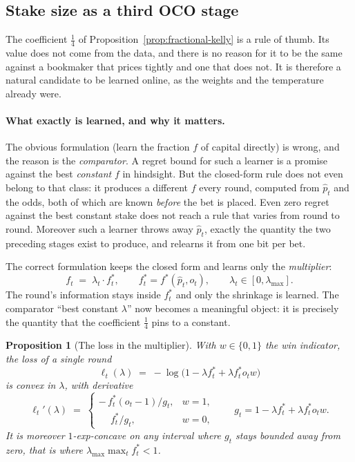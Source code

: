 \documentclass[12pt,a4paper,oneside]{report}
\renewcommand{\_}{\oldunderscore\allowbreak}
\theoremstyle{definition}
\theoremstyle{plain}
\newtheorem{proposition}[theorem]{Proposition}
\theoremstyle{definition}   %
\begin{document}
\subsection{Stake size as a third OCO stage}
\label{sec:oco-kelly-theory}

The coefficient $\tfrac14$ of Proposition~\ref{prop:fractional-kelly} is a rule of thumb. Its
value does not come from the data, and there is no reason for it to be the same against a
bookmaker that prices tightly and one that does not. It is therefore a natural candidate to be
learned online, as the weights and the temperature already were.

\paragraph{What exactly is learned, and why it matters.} The obvious formulation (learn the
fraction $f$ of capital directly) is wrong, and the reason is the \emph{comparator}. A regret
bound for such a learner is a promise against the best \emph{constant} $f$ in hindsight. But
the closed-form rule does not even belong to that class: it produces a different $f$ every
round, computed from $\hat{p}_t$ and the odds, both of which are known \emph{before} the bet is
placed. Even zero regret against the best constant stake does not reach a rule that varies from
round to round. Moreover such a learner throws away $\hat{p}_t$, exactly the quantity the two
preceding stages exist to produce, and relearns it from one bit per bet.

The correct formulation keeps the closed form and learns only the \emph{multiplier}:
\[
f_t \;=\; \lambda_t \cdot f^{*}_t, \qquad f^{*}_t = f^{*}(\hat{p}_t, o_t),
\qquad \lambda_t \in [0, \lambda_{\max}].
\]
The round's information stays inside $f^{*}_t$ and only the shrinkage is learned. The comparator
``best constant $\lambda$'' now becomes a meaningful object: it is precisely the quantity that
the coefficient $\tfrac14$ pins to a constant.

\begin{proposition}[The loss in the multiplier]
\label{prop:oco-kelly}
With $w \in \{0,1\}$ the win indicator, the loss of a single round
\[
\ell_t(\lambda) \;=\; -\log\big(1 - \lambda f^{*}_t + \lambda f^{*}_t o_t w\big)
\]
is convex in $\lambda$, with derivative
\[
\ell_t'(\lambda) \;=\;
\begin{cases}
-\,f^{*}_t (o_t-1) / g_t, & w=1,\\[2pt]
\phantom{-}f^{*}_t / g_t, & w=0,
\end{cases}
\qquad g_t = 1 - \lambda f^{*}_t + \lambda f^{*}_t o_t w .
\]
It is moreover $1$-exp-concave on any interval where $g_t$ stays bounded away from zero, that is
where $\lambda_{\max}\max_t f^{*}_t < 1$.
\end{proposition}
\end{document}
